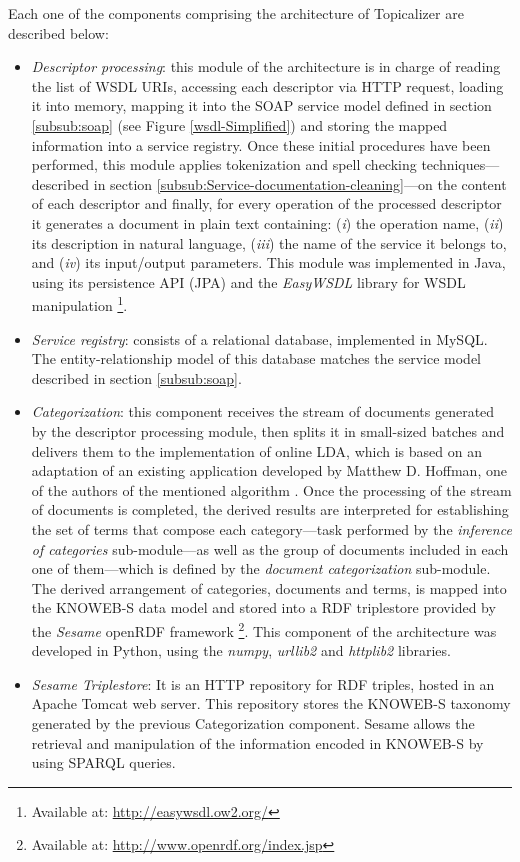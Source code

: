 Each one of the components comprising the architecture of Topicalizer are described below:
\begin{itemize}

\item \emph{Descriptor processing}: this module of the architecture is in charge of reading the list of WSDL URIs, accessing each descriptor via HTTP request, loading it into memory, mapping it into the SOAP service model defined in section \ref{subsub:soap} (see Figure \ref{wsdl-Simplified}) and storing the mapped information into a service registry. Once these initial procedures have been performed, this module applies tokenization and spell checking techniques---described in section \ref{subsub:Service-documentation-cleaning}---on the content of each descriptor and finally, for every operation of the processed descriptor it generates a document in plain text containing: (\emph{i}) the operation name, (\emph{ii}) its description in natural language, (\emph{iii}) the name of the service it belongs to, and (\emph{iv}) its input/output parameters. This module was implemented in Java, using its persistence API (JPA) and the \emph{EasyWSDL} library for WSDL manipulation \footnote{Available at: \href{http://easywsdl.ow2.org/}{http://easywsdl.ow2.org/}}.

\item \emph{Service registry}: consists of a relational database, implemented in MySQL. The entity-relationship model of this database matches the service model described in section \ref{subsub:soap}. 

\item \emph{Categorization}: this component receives the stream of documents generated by the descriptor processing module, then splits it in small-sized batches and delivers them to the implementation of online LDA, which is based on an adaptation of an existing application developed by Matthew D. Hoffman, one of the authors of the mentioned algorithm \cite{Hoffman:2010}. Once the processing of the stream of documents is completed, the derived results are interpreted for establishing the set of terms that compose each category---task performed by the \emph{inference of categories }sub-module---as well as the group of documents included in each one of them---which is defined by the \emph{document categorization} sub-module. The derived arrangement of categories, documents and terms, is mapped into the KNOWEB-S data model and stored into a RDF triplestore provided by the \emph{Sesame} openRDF framework \footnote{Available at: \href{http://www.openrdf.org/index.jsp}{http://www.openrdf.org/index.jsp}}. This component of the architecture was developed in Python, using the \emph{numpy}, \emph{urllib2} and \emph{httplib2} libraries.

\item \emph{Sesame Triplestore}: It is an HTTP repository for RDF triples, hosted in an Apache Tomcat web server. This repository stores the KNOWEB-S taxonomy generated by the previous Categorization component. Sesame allows the retrieval and manipulation of the information encoded in KNOWEB-S by using SPARQL queries.
\end{itemize}

